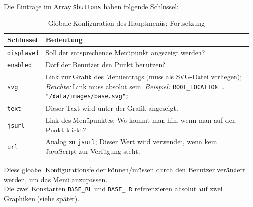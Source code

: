 Die Einträge im Array \texttt{\$buttons} haben folgende Schlüssel:\\
\begin{table}[H]
\centering
\begin{tabular}{p{2.5 cm}p{11 cm}}
	\toprule
		\textbf{Schlüssel} & \textbf{Bedeutung} \\
	\midrule
		\texttt{displayed} & Soll der entsprechende Menüpunkt angezeigt werden?\\
		\hline
		\texttt{enabled} & Darf der Benutzer den Punkt benutzen?\\
		\hline
		\texttt{svg} & Link zur Grafik des Menüentrags (muss als SVG-Datei vorliegen); \newline
			\textit{Beachte:} Link muss absolut sein.\newline
			\textit{Beispiel:} \texttt{ROOT\_LOCATION . "/data/images/base.svg";}
			\\
		\hline
		\texttt{text} & Dieser Text wird unter der Grafik angezeigt.\\
		\hline
		\texttt{jsurl} & Link des Menüpunktes; Wo kommt man hin, wenn man auf den Punkt klickt?\\
		\hline
		\texttt{url} & Analog zu \texttt{jsurl}; Dieser Wert wird verwendet, wenn kein JavaScript zur Verfügung steht.\\
	\bottomrule
\end{tabular}
\caption{Globale Konfiguration des Hauptmenüs; Fortsetzung}
\label{tab:content_imple_design_menu_buttons}
\end{table}
Diese gloabel Konfigurationsfelder können/müssen durch den Benutzer verändert werden, um das Menü anzupassen.\\
Die zwei Konstanten \texttt{BASE\_RL} und \texttt{BASE\_LR} referenzieren absolut auf zwei Graphiken (siehe später).
